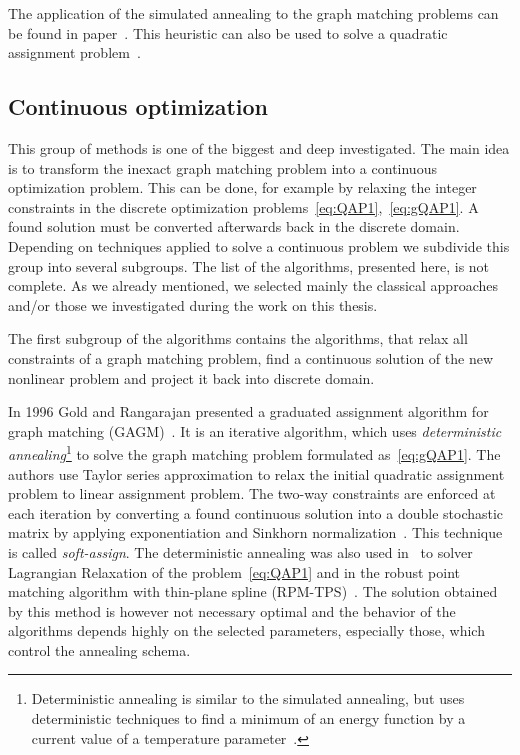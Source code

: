 The application of the simulated annealing to the graph matching problems can be found in paper~\cite{Herault1990_SimulatedAnnealing}. This heuristic can also be used to solve a quadratic assignment problem~\cite{Burkard98thequadratic}.
\subsection{Continuous optimization}
This group of methods is one of the biggest and deep investigated. The main idea is to transform the inexact graph matching problem into a continuous optimization problem. This can be done, for example by relaxing the integer constraints in the discrete optimization problems~\eqref{eq:QAP1},~\eqref{eq:gQAP1}. A found solution must be converted afterwards back in the discrete domain. Depending on techniques applied to solve a continuous problem we subdivide this group into several subgroups. The list of the algorithms, presented here, is not complete. As we already mentioned, we selected mainly the classical approaches and/or those we investigated during the work on this thesis.

The first subgroup of the algorithms contains the algorithms, that relax all constraints of a graph matching problem, find a continuous solution of the new nonlinear problem and project it back into discrete domain. 

In 1996 Gold and Rangarajan presented a graduated assignment algorithm for graph matching (GAGM)~\cite{Rangarajan1996_GAGM}. It is an iterative algorithm, which uses \emph{deterministic annealing}\footnote{Deterministic annealing is similar to the simulated annealing, but uses deterministic techniques to find a minimum of an energy function by a current value of a temperature parameter~\cite{Rose1991_DA}.} to solve the graph matching problem formulated as~\eqref{eq:gQAP1}. The authors use Taylor series approximation to relax the initial quadratic assignment problem to linear assignment problem. The two-way constraints are enforced at each iteration by converting a  found continuous solution into a double stochastic matrix by applying exponentiation and Sinkhorn normalization~\cite{Sinkhorn1964}. This technique is called \emph{soft-assign}. The deterministic annealing was also used in~\cite{Rangarajan96_LagRelax} to solver Lagrangian Relaxation of the problem~\eqref{eq:QAP1} and in the robust point matching algorithm with thin-plane spline (RPM-TPS)~\cite{Chui2003}. The solution obtained by this method is however not necessary optimal and the behavior of the algorithms depends highly on the selected parameters, especially those, which control the annealing schema.

